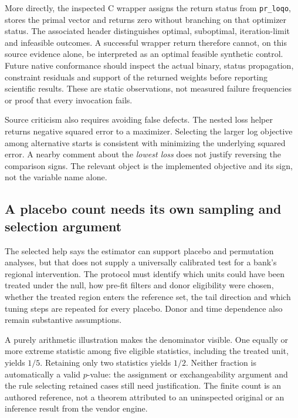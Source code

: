 More directly, the inspected C wrapper assigns the return status from
\texttt{pr\_loqo}, stores the primal vector and returns zero without branching
on that optimizer status. The associated header distinguishes optimal,
suboptimal, iteration-limit and infeasible outcomes. A successful wrapper return
therefore cannot, on this source evidence alone, be interpreted as an optimal
feasible synthetic control. Future native conformance should inspect the actual
binary, status propagation, constraint residuals and support of the returned
weights before reporting scientific results. These are static observations,
not measured failure frequencies or proof that every invocation fails.
\citep{exec19_synth_stata_source}

Source criticism also requires avoiding false defects. The nested loss helper
returns negative squared error to a maximizer. Selecting the larger log
objective among alternative starts is consistent with minimizing the underlying
squared error. A nearby comment about the \emph{lowest loss} does not justify
reversing the comparison signs. The relevant object is the implemented objective
and its sign, not the variable name alone.~\citep{exec19_synth_stata_source}

\subsection{A placebo count needs its own sampling and selection argument}
\label{exec19:synth-inference}

The selected help says the estimator can support placebo and permutation
analyses, but that does not supply a universally calibrated test for a bank's
regional intervention. The protocol must identify which units could have been
treated under the null, how pre-fit filters and donor eligibility were chosen,
whether the treated region enters the reference set, the tail direction and
which tuning steps are repeated for every placebo. Donor and time dependence
also remain substantive assumptions.

A purely arithmetic illustration makes the denominator visible. One equally or
more extreme statistic among five eligible statistics, including the treated
unit, yields $1/5$. Retaining only two statistics yields $1/2$. Neither fraction
is automatically a valid $p$-value: the assignment or exchangeability argument
and the rule selecting retained cases still need justification. The finite count
is an authored reference, not a theorem attributed to an uninspected original
or an inference result from the vendor engine.~\citep{exec19_synth_contract_reference}

